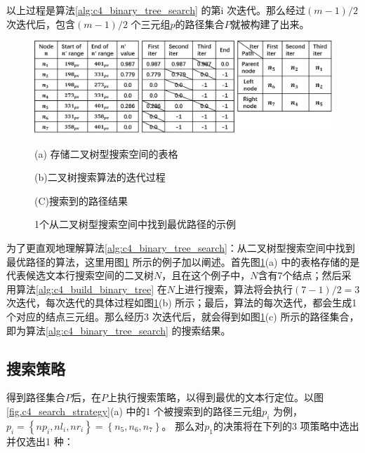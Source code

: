         以上过程是算法\ref{alg:c4_binary_tree_search} 的第i 次迭代。那么经过$(m-1)/2$次迭代后，包含$(m-1)/2$ 个三元组$p$的路径集合$P$就被构建了出来。

        \begin{figure}[!h]
        \centering
        \includegraphics[width=\textwidth]{./figures/c4_bianry_tree_search.jpg}
        \begin{minipage}[t]{0.33\linewidth}
        \centerline{\small (a) 存储二叉树型搜索空间的表格}
        \end{minipage}
        \begin{minipage}[t]{0.33\linewidth}
        \centerline{\small(b)二叉树搜索算法的迭代过程}
        \end{minipage}
        \begin{minipage}[t]{0.26\linewidth}
        \centerline{\small(C)搜索到的路径结果}
        \end{minipage}
        \caption{1个从二叉树型搜索空间中找到最优路径的示例}
        \label{fig.c4_bianry_tree_search}
        \end{figure}

        为了更直观地理解算法\ref{alg:c4_binary_tree_search}：从二叉树型搜索空间中找到最优路径的算法，这里用图\ref{fig.c4_bianry_tree_search} 所示的例子加以阐述。首先图\ref{fig.c4_bianry_tree_search}(a) 中的表格存储的是代表候选文本行搜索空间的二叉树$N$，且在这个例子中，$N$含有7个结点；然后采用算法\ref{alg:c4_build_binary_tree} 在$N$上进行搜索，算法将会执行$(7-1)/2=3$ 次迭代，每次迭代的具体过程如图\ref{fig.c4_bianry_tree_search}(b) 所示；最后，算法的每次迭代，都会生成1 个对应的结点三元组。那么经历3 次迭代后，就会得到如图\ref{fig.c4_bianry_tree_search}(c) 所示的路径集合，即为算法\ref{alg:c4_binary_tree_search} 的搜索结果。

        \subsection{搜索策略}
        \label{sec.c4_searching strategies}

        得到路径集合$P$后，在$P$上执行搜索策略，以得到最优的文本行定位。以图\ref{fig.c4_search_strategy}(a) 中的1 个被搜索到的路径三元组$p_i$ 为例，$p_i=\left\{np_i,nl_i,nr_i\right\}=\left\{n_5,n_6,n_7\right\}$。 那么对$p_1$的决策将在下列的3 项策略中选出并仅选出1 种：

